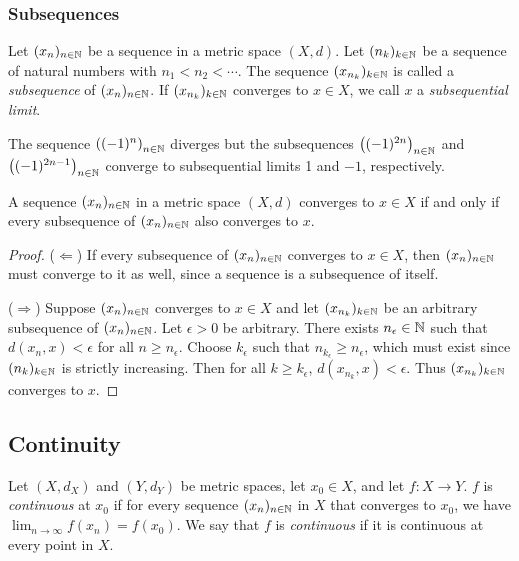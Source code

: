 \documentclass{article}
\begin{document}
\subsubsection{Subsequences}

\begin{definition}
Let $(x_n)_{n \in {\mathbb{N}}}$ be a sequence in a metric space $(X,d)$. Let $(n_k)_{k \in {\mathbb{N}}}$ be a sequence of natural numbers with $n_1 < n_2 < \cdots$. The sequence $(x_{n_k})_{k \in {\mathbb{N}}}$ is called a \emph{subsequence} of $(x_n)_{n \in {\mathbb{N}}}$. If $(x_{n_k})_{k \in {\mathbb{N}}}$ converges to $x \in X$, we call $x$ a \emph{subsequential limit}.
\end{definition}

\begin{example}
The sequence $\left((-1)^n\right)_{n \in {\mathbb{N}}}$ diverges but the subsequences $\left((-1)^{2n}\right)_{n \in {\mathbb{N}}}$ and $\left((-1)^{2n-1}\right)_{n\in {\mathbb{N}}}$ converge to subsequential limits 1 and $-1$, respectively.
\end{example}

\begin{proposition}
A sequence $(x_n)_{n \in {\mathbb{N}}}$ in a metric space $(X,d)$ converges to $x \in X$ if and only if every subsequence of $(x_n)_{n \in {\mathbb{N}}}$  also converges to $x$.
\end{proposition}
\begin{proof}
($\Leftarrow$) If every subsequence of $(x_n)_{n \in {\mathbb{N}}}$ converges to $x \in X$, then  $(x_n)_{n \in {\mathbb{N}}}$ must converge to it as well, since a sequence is a subsequence of itself. 

($\Rightarrow$) Suppose $(x_n)_{n \in {\mathbb{N}}}$ converges to $x \in X$ and let $(x_{n_k})_{k \in {\mathbb{N}}}$ be an arbitrary subsequence of $(x_n)_{n \in {\mathbb{N}}}$. Let $\epsilon > 0$ be arbitrary. There exists $n_\epsilon \in {\mathbb{N}}$ such that $d(x_n,x) < \epsilon$ for all $n \geq n_\epsilon$. Choose $k_\epsilon$ such that $n_{k_\epsilon} \geq n_\epsilon$, which must exist since $(n_k)_{k\in{\mathbb{N}}}$ is strictly increasing. Then for all $k \geq k_\epsilon$, $d(x_{n_k},x) < \epsilon$. Thus $(x_{n_k})_{k \in {\mathbb{N}}}$ converges to $x$.
\end{proof}


\subsection{Continuity}

\begin{definition}
Let $(X,d_X)$ and $(Y,d_Y)$ be metric spaces, let $x_0 \in X$, and let $f:X\to Y$. $f$ is \emph{continuous} at $x_0$ if for every sequence $(x_n)_{n\in{\mathbb{N}}}$ in $X$ that converges to $x_0$, we have $\lim_{n\to\infty}f(x_n)=f(x_0)$.
We say that $f$ is \emph{continuous} if it is continuous at every point in $X$.
\end{definition}
\end{document}
